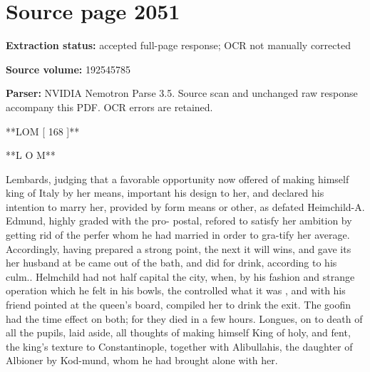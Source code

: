 \clearpage
\section{Source page 2051}
\textbf{Extraction status:} accepted full-page response; OCR not manually corrected\par
\textbf{Source volume:} 192545785\par
\textbf{Parser:} NVIDIA Nemotron Parse 3.5. Source scan and unchanged raw response accompany this PDF. OCR errors are retained.\par\medskip
**LOM [ 168 ]**\par\medskip
**L O M**\par\medskip
Lembards, judging that a favorable opportunity now offered of making himself king of Italy by her means, important his design to her, and declared his intention to marry her, provided by form means or other, as defated Heimchild-A. Edmund, highly graded with the pro- postal, refored to satisfy her ambition by getting rid of the perfer whom he had married in order to gra-tify her average. Accordingly, having prepared a strong point, the next it will wins, and gave its her husband at be came out of the bath, and did for drink, according to his culm.. Helmchild had not half capital the city, when, by his fashion and strange operation which he felt in his bowls, the controlled what it was , and with his friend pointed at the queen’s board, compiled her to drink the exit. The goofin had the time effect on both; for they died in a few hours. Longues, on to death of all the pupils, laid aside, all thoughts of making himself King of holy, and fent, the king’s texture to Constantinople, together with Alibullahis, the daughter of Albioner by Kod-mund, whom he had brought alone with her.\par\medskip
